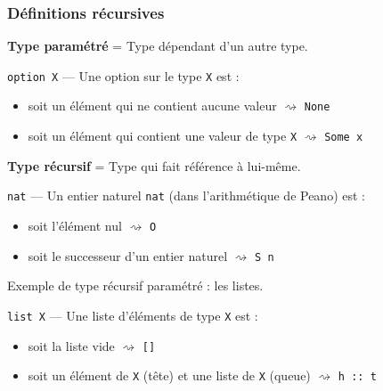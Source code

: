 \documentclass[9pt]{beamer}
\newenvironment{ex}[1][Exemple]{\begin{exampleblock}{#1}}{\end{exampleblock}}
\newcommand{\defi}[1]{\textbf{#1}}
\begin{document}
\begin{frame}
\frametitle{Définitions récursives}

\defi{Type paramétré} = Type dépendant d'un autre type.
\begin{ex}[\texttt{option X} --- Une option sur le type \texttt{X} est :]
\begin{itemize}
  \item soit un élément qui ne contient aucune valeur $\rightsquigarrow$ \texttt{None}
  \item soit un élément qui contient une valeur de type \texttt{X} $\rightsquigarrow$ \texttt{Some x}
\end{itemize}
\end{ex}

\pause
\medskip
\defi{Type récursif} = Type qui fait référence à lui-même.
\begin{ex}[\texttt{nat} --- Un entier naturel \texttt{nat} (dans l'arithmétique de Peano) est :]
\begin{itemize}
  \item soit l'élément nul $\rightsquigarrow$ \texttt{O}
  \item soit le successeur d'un entier naturel $\rightsquigarrow$ \texttt{S n}
\end{itemize}
\end{ex}

\pause
\medskip
Exemple de type récursif paramétré : les listes.
\begin{ex}[\texttt{list X} --- Une liste d'éléments de type \texttt{X} est :]
\begin{itemize}
  \item soit la liste vide $\rightsquigarrow$ \texttt{[]}
  \item soit un élément de \texttt{X} (tête) et une liste de \texttt{X} (queue) $\rightsquigarrow$ \texttt{h :: t}
\end{itemize}
\end{ex}
\end{frame}
\end{document}
